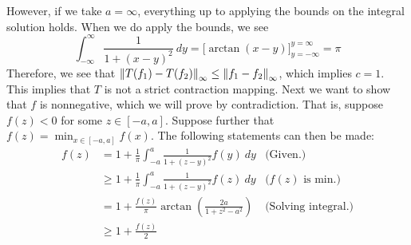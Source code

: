 \begin{solution}
    \newpage
    However, if we take $a = \infty$, everything up to applying the bounds on the integral solution holds. When we do apply the bounds, we see
    \[\int_{-\infty}^\infty \frac{1}{1+(x - y)^2} \ dy = \Big[\arctan (x - y) \Big]_{y = -\infty}^{y = \infty} = \pi\]
    Therefore, we see that $ \norm{T(f_1) - T(f_2)}_\infty \leq \norm{f_1 - f_2}_\infty$, which implies $c = 1$. This implies that $T$ is not a strict contraction mapping. Next we want to show that $f$ is nonnegative, which we will prove by contradiction. That is, suppose $f(z) < 0$ for some $z \in [-a, a]$. Suppose further that $f(z) = \min_{x \in [-a, a]} f(x)$. The following statements can then be made:
    \tightalignbreak
    \begin{align*}
        f(z) &= 1 + \frac{1}{\pi}\int_{-a}^a \frac{1}{1 + (z - y)^2} f(y) \ dy &\text{(Given.)}\\
        &\geq 1 + \frac{1}{\pi}\int_{-a}^a \frac{1}{1 + (z - y)^2} f(z) \ dy &\text{($f(z)$ is min.)}\\
        &= 1 + \frac{ f(z)}{\pi} \arctan\left( \frac{2a}{1 + z^2 - a^2} \right) &\text{(Solving integral.)}\\
        &\geq 1 + \frac{ f(z)}{2}  
    \end{align*}
\end{solution}
